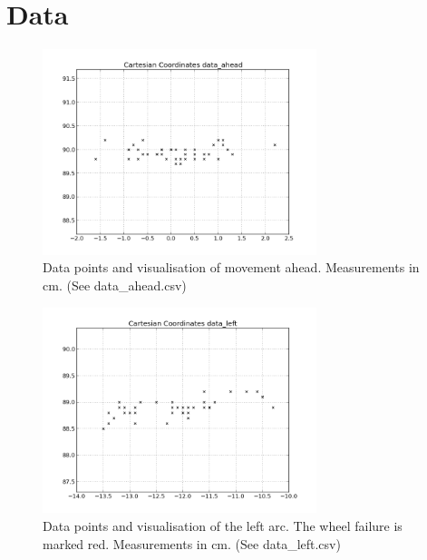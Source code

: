 \documentclass{scrartcl}
\begin{document}
\section{Data}

\begin{figure}[H]
\centering
\begin{minipage}{.5\textwidth}
  \centering
\end{minipage}%
\begin{minipage}{.5\textwidth}
  \centering
   \includegraphics[width= 8cm]{img/data_ahead.png}  
\end{minipage}
\caption{Data points and visualisation of movement ahead. Measurements in cm. (See data\_ahead.csv)}
\label{fig:data_ahead}
\end{figure}

\begin{figure}[H]
\centering
\begin{minipage}{.5\textwidth}
  \centering
\end{minipage}%
\begin{minipage}{.5\textwidth}
  \centering
   \includegraphics[width= 8cm]{img/data_left.png}
   
\end{minipage}
\caption{Data points and visualisation of the left arc. The wheel failure is marked red. Measurements in cm.  (See data\_left.csv)}
\label{fig:data_left}
\end{figure}
\end{document}

